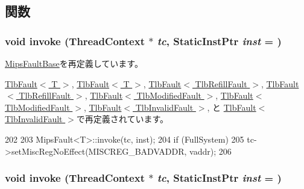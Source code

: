 \subsection{関数}
\hypertarget{classMipsISA_1_1AddressFault_a2bd783b42262278d41157d428e1f8d6f}{
\subsubsection[{invoke}]{\setlength{\rightskip}{0pt plus 5cm}void invoke ({\bf ThreadContext} $\ast$ {\em tc}, \/  {\bf StaticInstPtr} {\em inst} = {})}}
\label{classMipsISA_1_1AddressFault_a2bd783b42262278d41157d428e1f8d6f}


\hyperlink{classMipsISA_1_1MipsFaultBase_a2bd783b42262278d41157d428e1f8d6f}{MipsFaultBase}を再定義しています。

\hyperlink{classMipsISA_1_1TlbFault_a2bd783b42262278d41157d428e1f8d6f}{TlbFault$<$ T $>$}, \hyperlink{classMipsISA_1_1TlbFault_a2bd783b42262278d41157d428e1f8d6f}{TlbFault$<$ T $>$}, \hyperlink{classMipsISA_1_1TlbFault_a2bd783b42262278d41157d428e1f8d6f}{TlbFault$<$ TlbRefillFault $>$}, \hyperlink{classMipsISA_1_1TlbFault_a2bd783b42262278d41157d428e1f8d6f}{TlbFault$<$ TlbRefillFault $>$}, \hyperlink{classMipsISA_1_1TlbFault_a2bd783b42262278d41157d428e1f8d6f}{TlbFault$<$ TlbModifiedFault $>$}, \hyperlink{classMipsISA_1_1TlbFault_a2bd783b42262278d41157d428e1f8d6f}{TlbFault$<$ TlbModifiedFault $>$}, \hyperlink{classMipsISA_1_1TlbFault_a2bd783b42262278d41157d428e1f8d6f}{TlbFault$<$ TlbInvalidFault $>$}, と \hyperlink{classMipsISA_1_1TlbFault_a2bd783b42262278d41157d428e1f8d6f}{TlbFault$<$ TlbInvalidFault $>$}で再定義されています。


\begin{DoxyCode}
202     {
203         MipsFault<T>::invoke(tc, inst);
204         if (FullSystem)
205             tc->setMiscRegNoEffect(MISCREG_BADVADDR, vaddr);
206     }
\end{DoxyCode}
\hypertarget{classMipsISA_1_1AddressFault_a2bd783b42262278d41157d428e1f8d6f}{
\subsubsection[{invoke}]{\setlength{\rightskip}{0pt plus 5cm}void invoke ({\bf ThreadContext} $\ast$ {\em tc}, \/  {\bf StaticInstPtr} {\em inst} = {})}}
\label{classMipsISA_1_1AddressFault_a2bd783b42262278d41157d428e1f8d6f}



